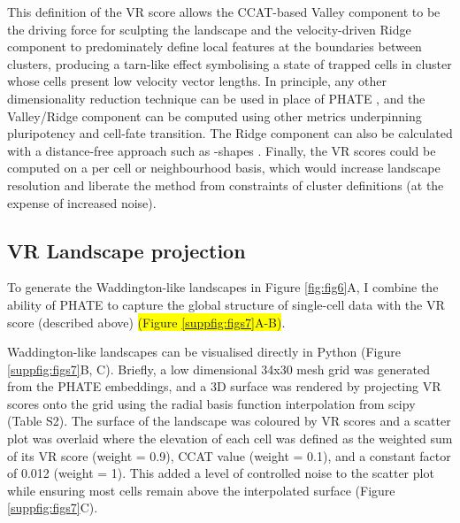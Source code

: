 
This definition of the VR score allows the CCAT-based Valley component to be the driving force for sculpting the landscape and the velocity-driven Ridge component to predominately define local features at the boundaries between clusters, producing a tarn-like effect symbolising a state of trapped cells in cluster whose cells present low velocity vector lengths. In principle, any other dimensionality reduction technique can be used in place of PHATE \cite{chen_single-cell_2019}, and the Valley/Ridge component can be computed using other metrics underpinning pluripotency and cell-fate transition. The Ridge component can also be calculated with a distance-free approach such as \textalpha-shapes \cite{bellock_bellockkalphashape_2021}. Finally, the VR scores could be computed on a per cell or neighbourhood basis, which would increase landscape resolution and liberate the method from constraints of cluster definitions (at the expense of increased noise).

\subsection{VR Landscape projection}

To generate the Waddington-like landscapes in Figure \ref{fig:fig6}A, I combine the ability of PHATE to capture the global structure of single-cell data with the VR score (described above) \colorbox{yellow}{(Figure \ref{suppfig:figs7}A-B)}. 

Waddington-like landscapes can be visualised directly in Python (Figure \ref{suppfig:figs7}B, C). Briefly, a low dimensional 34x30 mesh grid was generated from the PHATE embeddings, and a 3D surface was rendered by projecting VR scores onto the grid using the radial basis function interpolation from scipy \cite{virtanen_scipy_2020} (Table S2). The surface of the landscape was coloured by VR scores and a scatter plot was overlaid where the elevation of each cell was defined as the weighted sum of its VR score (weight = 0.9), CCAT value (weight = 0.1), and a constant factor of 0.012 (weight = 1). This added a level of controlled noise to the scatter plot while ensuring most cells remain above the interpolated surface (Figure \ref{suppfig:figs7}C).

